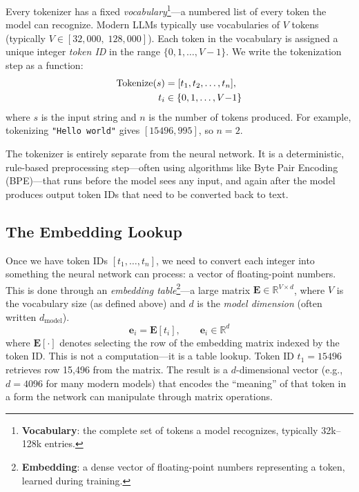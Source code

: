 Every tokenizer has a fixed \emph{vocabulary}\footnote{\textbf{Vocabulary}: the complete set of tokens a model recognizes, typically 32k--128k entries.}---a numbered list of every token the model can recognize. Modern LLMs typically use vocabularies of $V$ tokens (typically $V \in [32{,}000,\; 128{,}000]$). Each token in the vocabulary is assigned a unique integer \emph{token ID} in the range $\{0, 1, \ldots, V-1\}$. We write the tokenization step as a function:
\begin{align}
\text{Tokenize}(s) &= [t_1, t_2, \ldots, t_n], \notag\\
t_i &\in \{0, 1, \ldots, V{-}1\}
\end{align}
where $s$ is the input string and $n$ is the number of tokens produced. For example, tokenizing \texttt{"Hello world"} gives $[15496, 995]$, so $n = 2$.

The tokenizer is entirely separate from the neural network. It is a deterministic, rule-based preprocessing step---often using algorithms like Byte Pair Encoding (BPE)---that runs before the model sees any input, and again after the model produces output token IDs that need to be converted back to text.

\subsection{The Embedding Lookup}

Once we have token IDs $[t_1, \ldots, t_n]$, we need to convert each integer into something the neural network can process: a vector of floating-point numbers. This is done through an \emph{embedding table}\footnote{\textbf{Embedding}: a dense vector of floating-point numbers representing a token, learned during training.}---a large matrix $\mathbf{E} \in \mathbb{R}^{V \times d}$, where $V$ is the vocabulary size (as defined above) and $d$ is the \emph{model dimension} (often written $d_{\text{model}}$).
\begin{equation}
\mathbf{e}_i = \mathbf{E}[t_i], \qquad \mathbf{e}_i \in \mathbb{R}^d
\end{equation}
where $\mathbf{E}[\cdot]$ denotes selecting the row of the embedding matrix indexed by the token ID. This is not a computation---it is a table lookup. Token ID $t_1 = 15496$ retrieves row 15,496 from the matrix. The result is a $d$-dimensional vector (e.g., $d = 4096$ for many modern models) that encodes the ``meaning'' of that token in a form the network can manipulate through matrix operations.

